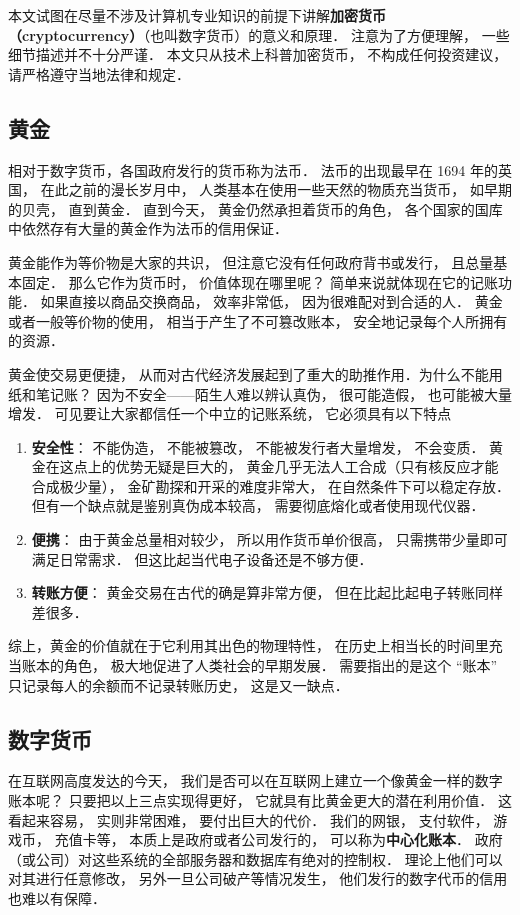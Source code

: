 
本文试图在尽量不涉及计算机专业知识的前提下讲解\textbf{加密货币（cryptocurrency）}（也叫数字货币）的意义和原理． 注意为了方便理解， 一些细节描述并不十分严谨． 本文只从技术上科普加密货币， 不构成任何投资建议， 请严格遵守当地法律和规定．

\subsection{黄金}
相对于数字货币，各国政府发行的货币称为法币． 法币的出现最早在 1694 年的英国， 在此之前的漫长岁月中， 人类基本在使用一些天然的物质充当货币， 如早期的贝壳， 直到黄金． 直到今天， 黄金仍然承担着货币的角色， 各个国家的国库中依然存有大量的黄金作为法币的信用保证．

黄金能作为等价物是大家的共识， 但注意它没有任何政府背书或发行， 且总量基本固定． 那么它作为货币时， 价值体现在哪里呢？ 简单来说就体现在它的记账功能． 如果直接以商品交换商品， 效率非常低， 因为很难配对到合适的人． 黄金或者一般等价物的使用， 相当于产生了不可篡改账本， 安全地记录每个人所拥有的资源．

黄金使交易更便捷， 从而对古代经济发展起到了重大的助推作用．为什么不能用纸和笔记账？ 因为不安全——陌生人难以辨认真伪， 很可能造假， 也可能被大量增发． 可见要让大家都信任一个中立的记账系统， 它必须具有以下特点
\begin{enumerate}
\item \textbf{安全性}： 不能伪造， 不能被篡改， 不能被发行者大量增发， 不会变质． 黄金在这点上的优势无疑是巨大的， 黄金几乎无法人工合成（只有核反应才能合成极少量）， 金矿勘探和开采的难度非常大， 在自然条件下可以稳定存放． 但有一个缺点就是鉴别真伪成本较高， 需要彻底熔化或者使用现代仪器．
\item \textbf{便携}： 由于黄金总量相对较少， 所以用作货币单价很高， 只需携带少量即可满足日常需求． 但这比起当代电子设备还是不够方便．
\item \textbf{转账方便}： 黄金交易在古代的确是算非常方便， 但在比起比起电子转账同样差很多．
\end{enumerate}

综上，黄金的价值就在于它利用其出色的物理特性， 在历史上相当长的时间里充当账本的角色， 极大地促进了人类社会的早期发展． 需要指出的是这个 “账本” 只记录每人的余额而不记录转账历史， 这是又一缺点．

\subsection{数字货币}
在互联网高度发达的今天， 我们是否可以在互联网上建立一个像黄金一样的数字账本呢？ 只要把以上三点实现得更好， 它就具有比黄金更大的潜在利用价值． 这看起来容易， 实则非常困难， 要付出巨大的代价． 我们的网银， 支付软件， 游戏币， 充值卡等， 本质上是政府或者公司发行的， 可以称为\textbf{中心化账本}． 政府（或公司）对这些系统的全部服务器和数据库有绝对的控制权． 理论上他们可以对其进行任意修改， 另外一旦公司破产等情况发生， 他们发行的数字代币的信用也难以有保障．

